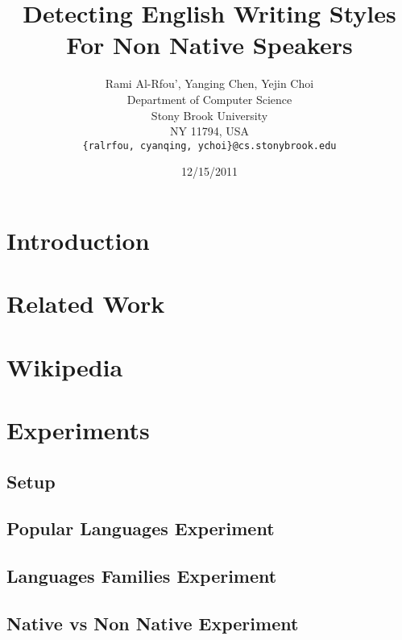 \documentclass[11pt]{article}
\title{Detecting English Writing Styles For Non Native Speakers}
\author{Rami Al-Rfou', Yanging Chen, Yejin Choi \\
  Department of Computer Science \\
  Stony Brook University \\
  NY 11794, USA \\
  {\tt \{ralrfou, cyanqing, ychoi\}@cs.stonybrook.edu}}
\date{12/15/2011}
\begin{document}
\maketitle
\begin{abstract}
\end{abstract}


\section{Introduction}

\section{Related Work}


\section{Wikipedia}

\section{Experiments}

\subsection{Setup}

\subsection{Popular Languages Experiment}


\subsection{Languages Families Experiment}


\subsection{Native vs Non Native Experiment}
\end{document}
